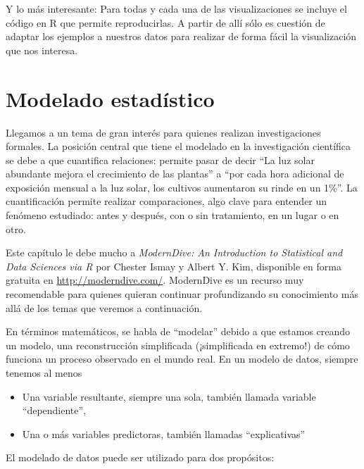 \documentclass[spanish,]{book}
\providecommand{\tightlist}{%
  \setlength{\itemsep}{0pt}\setlength{\parskip}{0pt}}
\begin{document}
Y lo más interesante: Para todas y cada una de las visualizaciones se incluye el código en R que permite reproducirlas. A partir de allí sólo es cuestión de adaptar los ejemplos a nuestros datos para realizar de forma fácil la visualización que nos interesa.

\hypertarget{modelado-estadistico}{%
\chapter{Modelado estadístico}\label{modelado-estadistico}}

Llegamos a un tema de gran interés para quienes realizan investigaciones formales. La posición central que tiene el modelado en la investigación científica se debe a que cuantifica relaciones: permite pasar de decir ``La luz solar abundante mejora el crecimiento de las plantas'' a ``por cada hora adicional de exposición mensual a la luz solar, los cultivos aumentaron su rinde en un 1\%''. La cuantificación permite realizar comparaciones, algo clave para entender un fenómeno estudiado: antes y después, con o sin tratamiento, en un lugar o en otro.

Este capítulo le debe mucho a \emph{ModernDive: An Introduction to Statistical and Data Sciences via R} por Chester Ismay y Albert Y. Kim, disponible en forma gratuita en \url{http://moderndive.com/}. ModernDive es un recurso muy recomendable para quienes quieran continuar profundizando su conocimiento más allá de los temas que veremos a continuación.

En términos matemáticos, se habla de ``modelar'' debido a que estamos creando un modelo, una reconstrucción simplificada (¡simplificada en extremo!) de cómo funciona un proceso observado en el mundo real. En un modelo de datos, siempre tenemos al menos

\begin{itemize}
\tightlist
\item
  Una variable resultante, siempre una sola, también llamada variable ``dependiente'',
\item
  Una o más variables predictoras, también llamadas ``explicativas''
\end{itemize}

El modelado de datos puede ser utilizado para dos propósitos:
\end{document}
